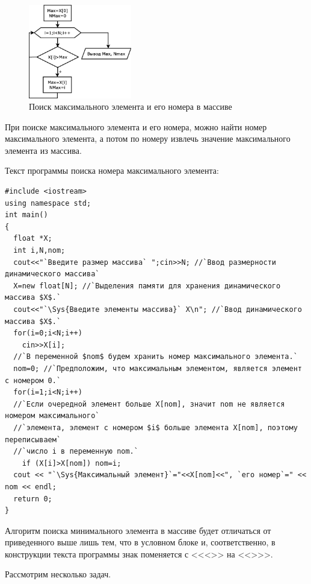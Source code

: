 \begin{figure}[htb]
\begin{center}
\includegraphics[width=0.4\textwidth]{img/ris_5_7}
\caption{Поиск максимального элемента и его номера в массиве}
\label{ch05:refDrawing6}
\end{center}
\end{figure}




При поиске максимального элемента и его номера, можно найти номер максимального элемента, а потом по номеру извлечь
значение максимального элемента из массива.

Текст программы поиска номера максимального элемента:
\begin{lstlisting}
#include <iostream>
using namespace std;
int main()
{
  float *X;
  int i,N,nom;
  cout<<"`Введите размер массива` ";cin>>N; //`Ввод размерности динамического массива`
  X=new float[N]; //`Выделения памяти для хранения динамического массива $X$.`
  cout<<"`\Sys{Введите элементы массива}` X\n"; //`Ввод динамического массива $X$.`
  for(i=0;i<N;i++)
    cin>>X[i];
  //`В переменной $nom$ будем хранить номер максимального элемента.` 
  nom=0; //`Предположим, что максимальным элементом, является элемент с номером 0.`
  for(i=1;i<N;i++)
  //`Если очередной элемент больше X[nom], значит nom не является номером максимального`
  //`элемента, элемент с номером $i$ больше элемента X[nom], поэтому переписываем`
  //`число i в переменную nom.`
    if (X[i]>X[nom]) nom=i;
  cout << "`\Sys{Максимальный элемент}`="<<X[nom]<<", `его номер`=" << nom << endl;
  return 0;
}
\end{lstlisting}

 Алгоритм поиска минимального элемента в массиве будет отличаться от приведенного выше лишь тем, что в
условном блоке и, соответственно, в конструкции  текста программы знак поменяется с <<{<}>> на <<{>}>>.

Рассмотрим несколько задач.


